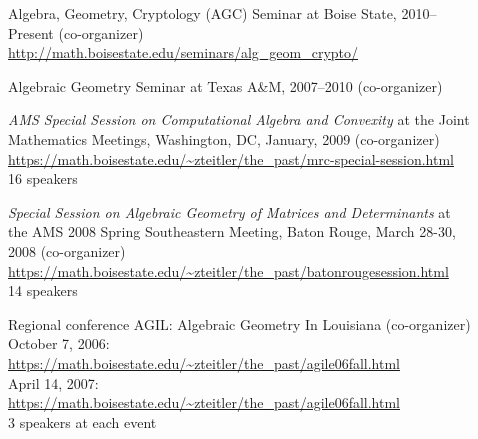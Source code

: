 \documentclass[12pt]{article}
\begin{document}
\begin{description}
\item[] Algebra, Geometry, Cryptology (AGC) Seminar at Boise State, 2010--Present (co-organizer) \\
\url{http://math.boisestate.edu/seminars/alg_geom_crypto/}

\item[] Algebraic Geometry Seminar at Texas A\&M, 2007--2010 (co-organizer)

\item[] \textit{AMS Special Session on Computational Algebra and Convexity}
at the Joint Mathematics Meetings, Washington, DC, January, 2009 (co-organizer) \\
\url{https://math.boisestate.edu/~zteitler/the_past/mrc-special-session.html} \\
16 speakers

\item[] \textit{Special Session on Algebraic Geometry of Matrices and Determinants}
at the AMS 2008 Spring Southeastern Meeting, Baton Rouge, March 28-30, 2008 (co-organizer) \\
\url{https://math.boisestate.edu/~zteitler/the_past/batonrougesession.html} \\
14 speakers

\item[] Regional conference AGIL: Algebraic Geometry In Louisiana (co-organizer) \\
October 7, 2006: \url{https://math.boisestate.edu/~zteitler/the_past/agile06fall.html} \\
April 14, 2007: \url{https://math.boisestate.edu/~zteitler/the_past/agile06fall.html} \\
3 speakers at each event


\end{description}
\end{document}
